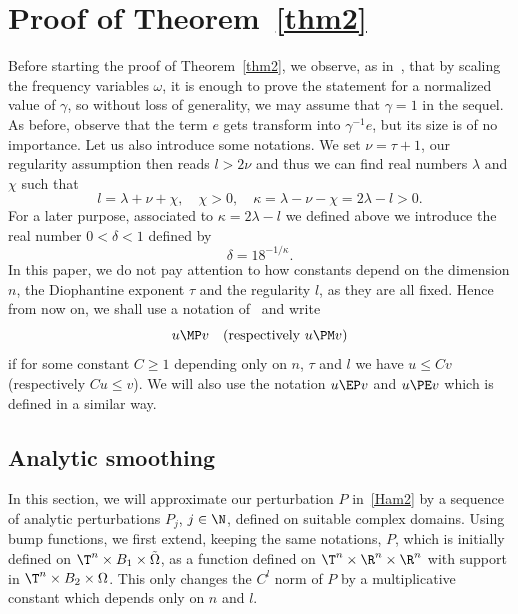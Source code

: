 \section{Proof of Theorem~\ref{thm2}}\label{s3}

Before starting the proof of Theorem~\ref{thm2}, we observe, as in~\cite{Pos82}, that by scaling the frequency variables $\omega$, it is enough to prove the statement for a normalized value of $\gamma$, so without loss of generality, we may assume that $\gamma=1$ in the sequel. As before, observe that the term $e$ gets transform into $\gamma^{-1}e$, but its size is of no importance. Let us also introduce some notations. We set $\nu=\tau+1$, our regularity assumption then reads $l>2\nu$ and thus we can find real numbers $\lambda$ and $\chi$ such that
\begin{equation}\label{numbers}
l=\lambda+\nu+\chi, \quad \chi>0, \quad \kappa=\lambda-\nu-\chi=2\lambda-l>0.
\end{equation}
For a later purpose, associated to $\kappa=2\lambda-l$ we defined above we introduce the real number $0<\delta<1$ defined by
\begin{equation}\label{delta}
\delta=18^{-1/\kappa}.
\end{equation}
In this paper, we do not pay attention to how constants depend on the dimension $n$, the Diophantine exponent $\tau$ and the regularity $l$, as they are all fixed. Hence from now on, we shall use a notation of~\cite{Pos01} and write
$$u \MP v \quad (\mbox{respectively } u \PM v)$$
if for some constant $C\geq 1$ depending only on $n$, $\tau$ and $l$ we have $u\leq Cv$ (respectively $Cu \leq v$). We will also use the notation $u \EP v$ and $u \PE v$ which is defined in a similar way.

\subsection{Analytic smoothing}

In this section, we will approximate our perturbation $P$ in~\eqref{Ham2} by a sequence of analytic perturbations $P_j$, $j \in \N$, defined on suitable complex domains. Using bump functions, we first extend, keeping the same notations, $P$, which is initially defined on $\T^n \times B_1 \times \tilde{\Omega}$, as a function defined on $\T^n \times \R^n \times \R^n$ with support in $\T^n \times B_2 \times \Omega$. This only changes the $C^l$ norm of $P$ by a multiplicative constant which depends only on $n$ and $l$.

